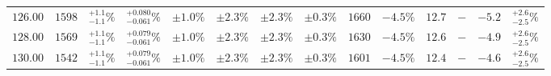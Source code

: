 \begin{landscape}
\begin{table}[ht!]
{\begin{tabular}{| cc | ccc | ccc | ccc | cc | c |}
$126.00$ & $1598$ & $^{+1.1}_{-1.1}\%$ & {\color{black!55}$^{+0.080}_{-0.061}\%$} & {\color{black!55}$\pm 1.0\%$} & $\pm 2.3\%$ & {\color{black!55}$\pm 2.3\%$} & {\color{black!55}$\pm 0.3\%$} & $1660$ & $-4.5\%$ & $12.7$ & $-$ & $-5.2$ & $^{+2.6}_{-2.5}\%$ \\
$128.00$ & $1569$ & $^{+1.1}_{-1.1}\%$ & {\color{black!55}$^{+0.079}_{-0.061}\%$} & {\color{black!55}$\pm 1.0\%$} & $\pm 2.3\%$ & {\color{black!55}$\pm 2.3\%$} & {\color{black!55}$\pm 0.3\%$} & $1630$ & $-4.5\%$ & $12.6$ & $-$ & $-4.9$ & $^{+2.6}_{-2.5}\%$ \\
$130.00$ & $1542$ & $^{+1.1}_{-1.1}\%$ & {\color{black!55}$^{+0.079}_{-0.061}\%$} & {\color{black!55}$\pm 1.0\%$} & $\pm 2.3\%$ & {\color{black!55}$\pm 2.3\%$} & {\color{black!55}$\pm 0.3\%$} & $1601$ & $-4.5\%$ & $12.4$ & $-$ & $-4.6$ & $^{+2.6}_{-2.5}\%$ \\
\cline{1-14}
\end{tabular}
}
\end{table}


\end{landscape}
